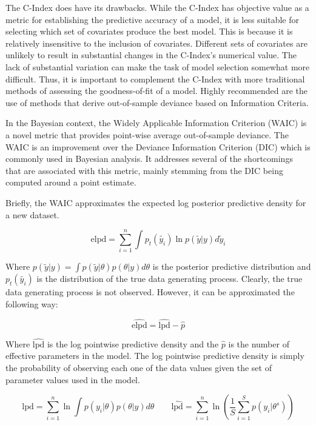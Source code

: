 
The C-Index does have its drawbacks. While the C-Index has objective value as a metric for establishing the predictive accuracy of a model, it is less suitable for selecting which set of covariates produce the best model. This is because it is relatively insensitive to the inclusion of covariates\cite{Cook2007}. Different sets of covariates are unlikely to result in substantial changes in the C-Index's numerical value. The lack of substantial variation can make the task of model selection somewhat more difficult. Thus, it is important to complement the C-Index with more traditional methods of assessing the goodness-of-fit of a model. Highly recommended are the use of methods that derive out-of-sample deviance based on Information Criteria. 

In the Bayesian context, the Widely Applicable Information Criterion (WAIC) is a novel metric that provides point-wise average out-of-sample deviance\cite{Watanabe2010}. The WAIC is an improvement over the Deviance Information Criterion (DIC) which is commonly used in Bayesian analysis. It addresses several of the shortcomings that are associated with this metric, mainly stemming from the DIC being computed around a point estimate. 

Briefly, the WAIC approximates the expected log posterior predictive density for a new dataset\cite{Vehtari2015}. 

$$ \text{elpd} = \sum_{i=1}^n \int p_t(\tilde{y_i})\ln p(\tilde{y}|y) d\tilde{y}_i $$

Where $p(\tilde{y}|y) = \int p(\tilde{y}|\theta)p(\theta|y) d\theta$ is the posterior predictive distribution and $p_t(\tilde{y_i})$ is the distribution of the true data generating process. Clearly, the true data generating process is not observed. However, it can be approximated the following way:

$$\hat{\text{elpd}} = \hat{\text{lpd}} - \hat{p}$$

Where $\hat{\text{lpd}}$ is the log pointwise predictive density and the $\hat{p}$ is the number of effective parameters in the model. The log pointwise predictive density is simply the probability of observing each one of the data values given the set of parameter values used in the model.

$$ \text{lpd} = \sum_{i=1}^n \ln \int p(y_i|\theta)p(\theta|y) d\theta \qquad \hat{\text{lpd}} = \sum_{i=1}^n \ln\left ( \frac{1}{S} \sum_{i = 1}^S p(y_i|\theta^s)  \right ) $$

